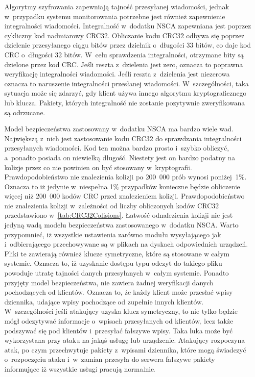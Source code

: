 Algorytmy szyfrowania zapewniają tajność przesyłanej wiadomości,
jednak w~przypadku systemu monitorowania potrzebne jest również
zapewnienie integralności wiadomości. Integralność w~dodatku NSCA
zapewniana jest poprzez cykliczny kod nadmiarowy CRC32. Obliczanie
kodu CRC32 odbywa się poprzez dzielenie przesyłanego ciągu bitów przez
dzielnik o~długości 33 bitów, co daje kod CRC o~długości 32
bitów. W~celu sprawdzenia integralności, otrzymane bity są dzielone
przez kod CRC. Jeśli reszta z~dzielenia jest zero, oznacza to poprawna
weryfikację integralności wiadomości. Jeśli reszta z~dzielenia jest
niezerowa oznacza to naruszenie integralności przesłanej
wiadomości. W~szczególności, taka sytuacja może się zdarzyć, gdy
klient używa innego algorytmu kryptograficznego lub klucza. Pakiety,
których integralność nie zostanie pozytywnie zweryfikowana są
odrzucane.

Model bezpieczeństwa zastosowany w~dodatku NSCA ma bardzo wiele
wad. Największą z~nich jest zastosowanie kodu CRC32 do sprawdzania
integralności przesyłanych wiadomości. Kod ten można bardzo prosto
i~szybko obliczyć, a~ponadto posiada on niewielką długość. Niestety
jest on bardzo podatny na kolizje przez co nie powinien on być
stosowany w~kryptografii. Prawdopodobieństwo nie znalezienia kolizji po
200~000 prób wynosi poniżej~1\%. Oznacza to iż jedynie w~niespełna 1\%
przypadków konieczne będzie obliczenie więcej niż 200~000 kodów CRC
przed znalezieniem kolizji. Prawdopodobieństwo nie znalezienia kolizji
w~zależności od liczby obliczonych kodów CRC32 przedstawiono
w~\ref{tab:CRC32Colisions}. Łatwość odnalezienia kolizji nie jest
jedyną wadą modelu bezpieczeństwa zastosowanego w~dodatku NSCA. Warto
przypomnieć, iż wszystkie ustawienia zarówno modułu wysyłającego jak
i~odbierającego przechowywane są w plikach na dyskach odpowiednich
urządzeń. Pliki te zawierają również klucze symetryczne, które są
stosowane w całym systemie. Oznacza to, iż uzyskanie dostępu typu
odczyt do takiego pliku powoduje utratę tajności danych przesyłanych
w~całym systemie. Ponadto przyjęty model bezpieczeństwa, nie zawiera
żadnej weryfikacji danych pochodzących od klientów. Oznacza to, że
każdy klient może przesłać wpisy dziennika, udające wpisy pochodzące od
zupełnie innych klientów. W~szczególności jeśli atakujący uzyska klucz
symetryczny, to nie tylko będzie mógł odczytywać informacje o~wpisach
przesyłanych od klientów, lecz także podszywać się pod klientów
i~przesyłać fałszywe wpisy. Taka luka może być wykorzystana przy ataku
na jakąś usługę lub urządzenie. Atakujący rozpoczyna atak, po czym
przechwytuje pakiety z~wpisami dziennika, które mogą świadczyć
o~rozpoczęciu ataku i~w~zamian przesyła do serwera fałszywe pakiety
informujące iż wszystkie usługi pracują normalnie.

